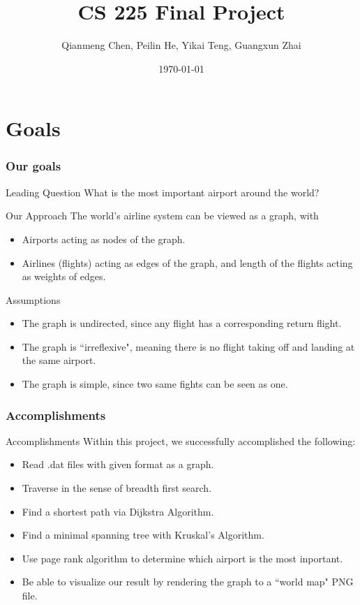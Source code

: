 \documentclass{beamer}
\title{CS 225 Final Project}
\author{Qianmeng Chen, Peilin He, Yikai Teng, Guangxun Zhai}
\institute{University of Illinois at Urbana-Champaign}
\date{\today}
\begin{document}
\frame{\titlepage}



\section{Goals}
\begin{frame}
\frametitle{Our goals} 
    \begin{block}{Leading Question}
        What is the most important airport around the world?
    \end{block}

    \begin{block}{Our Approach}
        The world's airline system can be viewed as a graph, with 
        \begin{itemize}
            \item Airports acting as nodes of the graph.
            \item Airlines (flights) acting as edges of the graph, and length of the flights acting as weights of edges.
        \end{itemize}
    \end{block}
    
    \begin{block}{Assumptions}
        \begin{itemize}
            \item The graph is undirected, since any flight has a corresponding return flight.
            \item The graph is ``irreflexive", meaning there is no flight taking off and landing at the same airport.
            \item The graph is simple, since two same fights can be seen as one.
        \end{itemize}
    \end{block}
\end{frame}



\begin{frame}
\frametitle{Accomplishments} 
    \begin{block}{Accomplishments}
        Within this project, we successfully accomplished the following:
        \begin{itemize}
            \item Read .dat files with given format as a graph.
            \item Traverse in the sense of breadth first search.
            \item Find a shortest path via Dijkstra Algorithm.
            \item Find a minimal spanning tree with Kruskal's Algorithm.
            \item Use page rank algorithm to determine which airport is the most inportant.
            \item Be able to visualize our result by rendering the graph to a ``world map" PNG file.
        \end{itemize}
    \end{block}
\end{frame}
\end{document}
